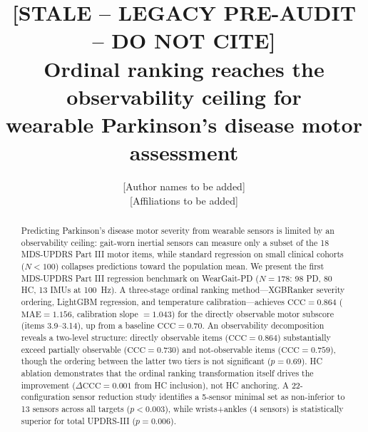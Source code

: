 \documentclass[11pt,a4paper]{article}
\title{\bfseries [STALE -- LEGACY PRE-AUDIT -- DO NOT CITE]\\ Ordinal ranking reaches the observability ceiling for\\ wearable Parkinson's disease motor assessment}
\author{[Author names to be added]\\[-2pt]\small [Affiliations to be added]}
\date{}
\begin{document}
\maketitle
\thispagestyle{empty}

\begin{center}
\end{center}

\begin{abstract}
\noindent Predicting Parkinson's disease motor severity from wearable sensors is limited by an observability ceiling: gait-worn inertial sensors can measure only a subset of the 18 MDS-UPDRS Part III motor items, while standard regression on small clinical cohorts ($N<100$) collapses predictions toward the population mean. We present the first MDS-UPDRS Part III regression benchmark on WearGait-PD ($N=178$: 98 PD, 80 HC, 13 IMUs at 100~Hz). A three-stage ordinal ranking method---XGBRanker severity ordering, LightGBM regression, and temperature calibration---achieves $\mathrm{CCC}=0.864$ ($\mathrm{MAE}=1.156$, calibration slope $=1.043$) for the directly observable motor subscore (items 3.9--3.14), up from a baseline $\mathrm{CCC}=0.70$. An observability decomposition reveals a two-level structure: directly observable items ($\mathrm{CCC}=0.864$) substantially exceed partially observable ($\mathrm{CCC}=0.730$) and not-observable items ($\mathrm{CCC}=0.759$), though the ordering between the latter two tiers is not significant ($p=0.69$). HC ablation demonstrates that the ordinal ranking transformation itself drives the improvement ($\Delta\mathrm{CCC}=0.001$ from HC inclusion), not HC anchoring. A 22-configuration sensor reduction study identifies a 5-sensor minimal set as non-inferior to 13 sensors across all targets ($p<0.003$), while wrists+ankles (4 sensors) is statistically superior for total UPDRS-III ($p=0.006$).
\end{abstract}
\end{document}
